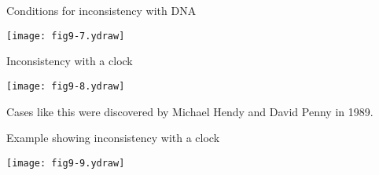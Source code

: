 \begin{slide}[Replace]{Conditions for inconsistency with DNA}

\centerline{\texttt{[image: fig9-7.ydraw]}}

\end{slide}

\begin{slide}[Replace]{Inconsistency with a clock}

\centerline{\texttt{[image: fig9-8.ydraw]}}
\bigskip

Cases like this were discovered by Michael Hendy and David Penny in 1989.

\end{slide}

\begin{slide}[Replace]{Example showing inconsistency with a clock}

\centerline{\texttt{[image: fig9-9.ydraw]}}

\end{slide}



